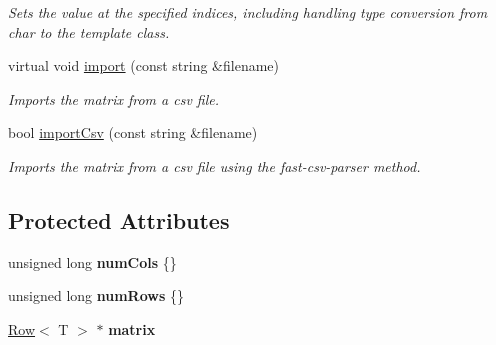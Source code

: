 \begin{DoxyCompactItemize}
\begin{DoxyCompactList}\small\item\em Sets the value at the specified indices, including handling type conversion from char to the template class. \end{DoxyCompactList}\item 
virtual void \hyperlink{class_matrix_a2476517be70c810ad586d0f0cf4ec121}{import} (const string \&filename)
\begin{DoxyCompactList}\small\item\em Imports the matrix from a csv file. \end{DoxyCompactList}\item 
bool \hyperlink{class_matrix_a0a5d9135e9807b81ddc3cf05e777a902}{import\+Csv} (const string \&filename)
\begin{DoxyCompactList}\small\item\em Imports the matrix from a csv file using the fast-\/csv-\/parser method. \end{DoxyCompactList}\end{DoxyCompactItemize}
\subsection*{Protected Attributes}
\begin{DoxyCompactItemize}
\item 
unsigned long {\bfseries num\+Cols} \{\}\hypertarget{class_matrix_a341aaedcfaac978957087bd0467dc527}{}\label{class_matrix_a341aaedcfaac978957087bd0467dc527}

\item 
unsigned long {\bfseries num\+Rows} \{\}\hypertarget{class_matrix_ac1e96667d48c7845708f978ddd17475d}{}\label{class_matrix_ac1e96667d48c7845708f978ddd17475d}

\item 
\hyperlink{class_row}{Row}$<$ T $>$ $\ast$ {\bfseries matrix}\hypertarget{class_matrix_a7a143ae112112155c9622ba17dc434c7}{}\label{class_matrix_a7a143ae112112155c9622ba17dc434c7}

\end{DoxyCompactItemize}
